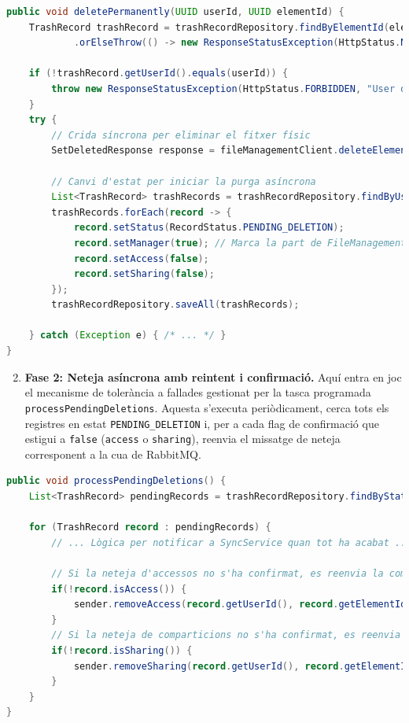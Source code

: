 \begin{lstlisting}[language=Java, caption={Inici de l'eliminació permanent a `TrashService`}]
public void deletePermanently(UUID userId, UUID elementId) {
    TrashRecord trashRecord = trashRecordRepository.findByElementId(elementId)
            .orElseThrow(() -> new ResponseStatusException(HttpStatus.NOT_FOUND, "Element not found..."));

    if (!trashRecord.getUserId().equals(userId)) {
        throw new ResponseStatusException(HttpStatus.FORBIDDEN, "User does not have permission...");
    }
    try {
        // Crida síncrona per eliminar el fitxer físic
        SetDeletedResponse response = fileManagementClient.deleteElementPermanently(elementId);
        
        // Canvi d'estat per iniciar la purga asíncrona
        List<TrashRecord> trashRecords = trashRecordRepository.findByUserIdAndElementIdIn(userId, response.getElementIds());
        trashRecords.forEach(record -> {
            record.setStatus(RecordStatus.PENDING_DELETION);
            record.setManager(true); // Marca la part de FileManagement com a feta
            record.setAccess(false);
            record.setSharing(false);
        });
        trashRecordRepository.saveAll(trashRecords);

    } catch (Exception e) { /* ... */ }
}
\end{lstlisting}

\begin{enumerate}
    \setcounter{enumi}{1}
    \item \textbf{Fase 2: Neteja asíncrona amb reintent i confirmació.} Aquí entra en joc el mecanisme de tolerància a fallades gestionat per la tasca programada \texttt{processPendingDeletions}. Aquesta s'executa periòdicament, cerca tots els registres en estat \texttt{PENDING\_DELETION} i, per a cada flag de confirmació que estigui a \texttt{false} (\texttt{access} o \texttt{sharing}), reenvia el missatge de neteja corresponent a la cua de RabbitMQ.
\end{enumerate}

\begin{lstlisting}[language=Java, caption={Lògica de processament de pendents a `TrashService`}]
public void processPendingDeletions() {
    List<TrashRecord> pendingRecords = trashRecordRepository.findByStatus(RecordStatus.PENDING_DELETION);
    
    for (TrashRecord record : pendingRecords) {
        // ... Lògica per notificar a SyncService quan tot ha acabat ...
        
        // Si la neteja d'accessos no s'ha confirmat, es reenvia la comanda
        if(!record.isAccess()) { 
            sender.removeAccess(record.getUserId(), record.getElementId());
        }
        // Si la neteja de comparticions no s'ha confirmat, es reenvia
        if(!record.isSharing()) { 
            sender.removeSharing(record.getUserId(), record.getElementId());
        }
    }
}
\end{lstlisting}


